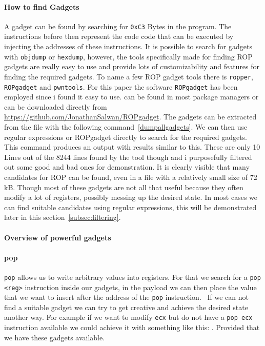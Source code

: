 \documentclass[journal=tosc,submission, notanonymous]{iacrtrans}
\begin{document}
\paragraph{How to find Gadgets}
\label{par:ropgadget}
A gadget can be found by searching for \Verb+0xC3+ Bytes in the program. The instructions before then represent the code code that can be executed by injecting the addresses of these instructions. It is possible to search for gadgets with \Verb+objdump+ or \Verb+hexdump+, however, the tools specifically made for finding ROP gadgets are really easy to use and provide lots of customizability and features for finding the required gadgets. To name a few ROP gadget tools there is \Verb+ropper+, \Verb+ROPgadget+ and \Verb+pwntools+. For this paper the software \Verb+ROPgadget+ has been employed since i found it easy to use.  can be found in most package managers or can be downloaded directly from \url{https://github.com/JonathanSalwan/ROPgadget}. The gadgets can be extracted from the file with the following command~\cref{dumpallgadgets}. We can then use regular expressions or ROPgadget directly to search for the required gadgets.
This command produces an output with results similar to this.
These are only 10 Lines out of the 8244 lines found by the tool though and i purposefully filtered out some good and bad ones for demonstration. It is clearly visible that many candidates for ROP can be found, even in a file with a relatively small size of 72 kB. Though most of these gadgets are not all that useful because they often modify a lot of registers, possibly messing up the desired state. In most cases we can find suitable candidates using regular expressions, this will be demonstrated later in this section~\cref{subsec:filtering}.
\paragraph{Overview of powerful gadgets}
\paragraph{pop}
\Verb+pop+ allows us to write arbitrary values into registers. For that we search for a \Verb+pop <reg>+ instruction inside our gadgets, in the payload we can then place the value that we want to insert after the address of the \Verb+pop+ instruction.~\cite{ropsla} If we can not find a suitable gadget we can try to get creative and achieve the desired state another way. For example if we want to modify \Verb+ecx+ but do not have a \Verb+pop ecx+ instruction available we could achieve it with something like this: . Provided that we have these gadgets available.
\end{document}
